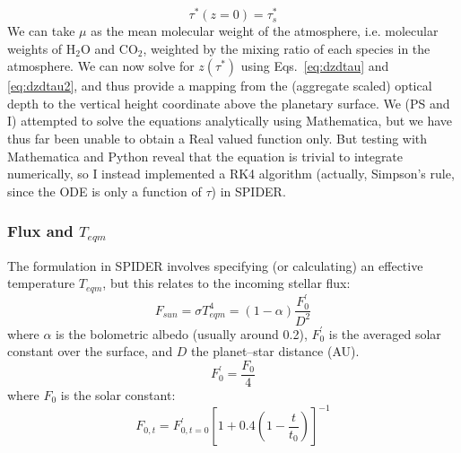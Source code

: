 \begin{equation}
\tau^\ast (z=0) = \tau^\ast_s
\label{eq:dzdtau2}
\end{equation}
We can take $\mu$ as the mean molecular weight of the atmosphere, i.e. molecular weights of H$_2$O and CO$_2$, weighted by the mixing ratio of each species in the atmosphere.  We can now solve for $z(\tau^\ast)$ using Eqs.~\ref{eq:dzdtau} and \ref{eq:dzdtau2}, and thus provide a mapping from the (aggregate scaled) optical depth to the vertical height coordinate above the planetary surface.  We (PS and I) attempted to solve the equations analytically using Mathematica, but we have thus far been unable to obtain a Real valued function only.  But testing with Mathematica and Python reveal that the equation is trivial to integrate numerically, so I instead implemented a RK4 algorithm (actually, Simpson's rule, since the ODE is only a function of $\tau$) in SPIDER.
\subsubsection{Flux and $T_{eqm}$}
The formulation in SPIDER involves specifying (or calculating) an effective temperature $T_{eqm}$, but this relates to the incoming stellar flux:
\begin{equation}
F_{sun} = \sigma T_{eqm}^4 = (1-\alpha) \frac{F_0^\prime}{D^2}
\end{equation}
where $\alpha$ is the bolometric albedo (usually around 0.2), $F_0^\prime$ is the averaged solar constant over the surface, and $D$ the planet--star distance (AU).
\begin{equation}
F_0^\prime = \frac{F_0}{4}
\end{equation}
where $F_0$ is the solar constant:
\begin{equation}
F_{0,t} = F_{0,t=0}^\prime \left[ 1 + 0.4 \left( 1 - \frac{t}{t_0} \right) \right] ^ {-1}
\end{equation}
